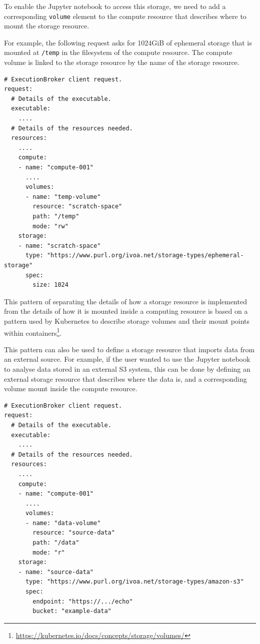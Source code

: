 \documentclass[11pt,a4paper]{ivoa}
\newcommand{\jupyternotebook} {Jupyter notebook}
\newcommand{\kubernetes} {Kubernetes}
\newcommand{\codeword}[1] {\texttt{#1}}
\newcommand{\footurl}[1] {\footnote{\url{#1}}}
\begin{document}
To enable the \jupyternotebook{} to access this storage, we need to add a
corresponding \codeword{volume} element to the compute resource that describes
where to mount the storage resource.

For example, the following request asks for 1024GiB of ephemeral storage
that is mounted at \codeword{/temp} in the filesystem of the compute resource.
The compute volume is linked to the storage resource by the name of the
storage resource.

\begin{lstlisting}[]
# ExecutionBroker client request.
request:
  # Details of the executable.
  executable:
    ....
  # Details of the resources needed.
  resources:
    ....
    compute:
    - name: "compute-001"
      ....
      volumes:
      - name: "temp-volume"
        resource: "scratch-space"
        path: "/temp"
        mode: "rw"
    storage:
    - name: "scratch-space"
      type: "https://www.purl.org/ivoa.net/storage-types/ephemeral-storage"
      spec:
        size: 1024
\end{lstlisting}

This pattern of separating the details of how a storage resource is implemented
from the details of how it is mounted inside a computing resource is based on a
pattern used by \kubernetes{} to describe storage volumes and their mount points
within containers\footurl{https://kubernetes.io/docs/concepts/storage/volumes/}.

This pattern can also be used to define a storage resource that imports data from
an external source.
For example, if the user wanted to use the \jupyternotebook{} to analyse data stored
in an external S3 system, this can be done by defining an external storage resource
that describes where the data is,
and a corresponding volume mount inside the compute resource.

\begin{lstlisting}[]
# ExecutionBroker client request.
request:
  # Details of the executable.
  executable:
    ....
  # Details of the resources needed.
  resources:
    ....
    compute:
    - name: "compute-001"
      ....
      volumes:
      - name: "data-volume"
        resource: "source-data"
        path: "/data"
        mode: "r"
    storage:
    - name: "source-data"
      type: "https://www.purl.org/ivoa.net/storage-types/amazon-s3"
      spec:
        endpoint: "https://.../echo"
        bucket: "example-data"
\end{lstlisting}
\end{document}
